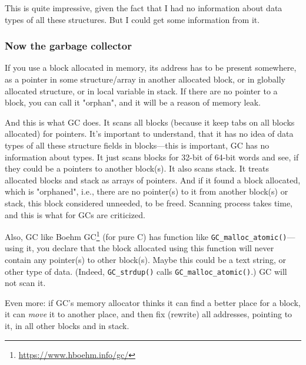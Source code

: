 This is quite impressive, given the fact that I had no information about data types of all these structures.
But I could get some information from it.

\subsubsection{Now the garbage collector}

If you use a block allocated in memory, its address has to be present somewhere, as a pointer in some structure/array in another allocated block,
or in globally allocated structure, or in local variable in stack.
If there are no pointer to a block, you can call it "orphan", and it will be a reason of memory leak.

And this is what \ac{GC} does.
It scans all blocks (because it keep tabs on all blocks allocated) for pointers.
It's important to understand, that it has no idea of data types of all these structure fields in blocks---this is important, \ac{GC} has no information about types.
It just scans blocks for 32-bit of 64-bit words and see, if they could be a pointers to another block(s).
It also scans stack.
It treats allocated blocks and stack as arrays of pointers.
And if it found a block allocated, which is "orphaned", i.e., there are no pointer(s) to it from another block(s) or stack, this block considered unneeded, to be freed.
Scanning process takes time, and this is what for \ac{GC}s are criticized.

Also, \ac{GC} like Boehm GC\footnote{\url{https://www.hboehm.info/gc/}} (for pure C) has function like \verb|GC_malloc_atomic()|---using it, you declare that the block allocated
using this function will never contain any pointer(s) to other block(s).
Maybe this could be a text string, or other type of data.
(Indeed, \verb|GC_strdup()| calls \verb|GC_malloc_atomic()|.)
\ac{GC} will not scan it.

Even more: if \ac{GC}'s memory allocator thinks it can find a better place for a block, it can \emph{move} it to another place, and then fix (rewrite) all addresses,
pointing to it, in all other blocks and in stack.


